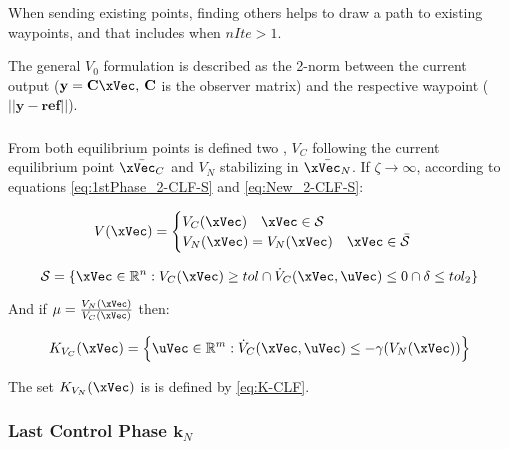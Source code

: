When sending existing points, finding others helps to draw a path to existing waypoints, and that includes when \(nIte >1\).\par
The general  \(V_0\) formulation is described as the 2-norm between the current output (\(\mathbf{y} = \mathbf{C}\xVec, \hspace{0.2em}\mathbf{C}\) is the observer matrix) and the respective waypoint (\(||\mathbf{y}-\mathbf{ref}||\)).


\subsubsection{}
\label{subsubsec:CLFs_Independent_Algorithm}

From both equilibrium points is defined two , \(V_C\) following the current equilibrium point \(\bar{\xVec_C}\) and \(V_N\) stabilizing in \(\bar{\xVec_N}\). If \(\zeta \to \infty\), according to equations \eqref{eq:1stPhase_2-CLF-S} and \eqref{eq:New_2-CLF-S}:


\begin{align}
    V(\xVec) = 
    \begin{cases}
        V_C(\xVec) \quad \xVec \in \mathcal{S}\\
        V_N(\xVec) = V_{N}(\xVec) \quad \xVec \in \bar{\mathcal{S}}
    \end{cases}
    \label{eq:New_2-CLF-I}
\end{align}


\begin{equation}
    \mathcal{S} = \{\xVec \in \mathbb{R}^n: V_{C}(\xVec) \geq tol \cap \dot{V}_{C}(\xVec, \uVec) \leq 0 \cap \delta \leq tol_2\}
    \label{eq:New_2-CLF-I_actuationPhaseSet}
\end{equation}



And if \(\mu = \frac{V_{N}(\xVec)}{V_{C}(\xVec)}\) then:

\begin{align}
    K_{V_C}(\xVec) = \Bigl\{\uVec \in \mathbb{R}^m:  \dot{V}_{C}(\xVec, \uVec) \leq -\gamma( V_{N}(\xVec)  )\Bigr\}
    \label{eq:2-CLF-I_Constraint}
\end{align}

The set \(K_{V_N}(\xVec)\) is is defined by \eqref{eq:K-CLF}. \par


\newpage %

\subsubsection{Last Control Phase \(\mathbf{k}_N\)}
\label{subsubsec:Last_Control_Phase}

